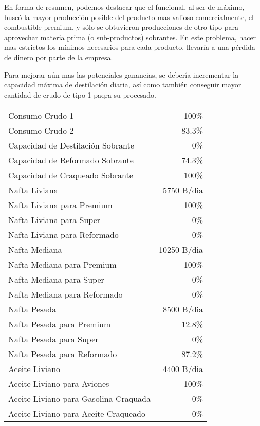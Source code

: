 \documentclass[a4paper,10pt]{article}
\begin{document}
En forma de resumen, podemos destacar que el funcional, al ser de m\'aximo, busc\'o la mayor producci\'on posible del producto mas valioso comercialmente, el combustible premium, y s\'olo se obtuvieron producciones de otro tipo para aprovechar materia prima (o sub-productos) sobrantes. En este problema, hacer mas estrictos los m\'inimos necesarios para cada producto, llevar\'ia a una p\'erdida de dinero por parte de la empresa.

Para mejorar a\'un mas las potenciales ganancias, se deber\'ia incrementar la capacidad m\'axima de destilaci\'on diaria, as\'i como tambi\'en conseguir mayor cantidad de crudo de tipo 1 paqra su procesado. 

\begin{center}
 \begin{tabular}{ l  r }
	\hline
	Consumo Crudo 1 			&	 100\% 	\\
	Consumo Crudo 2 			& 	83.3\%	\\ \hline
	Capacidad de Destilaci\'on Sobrante	&	   0\%	\\
	Capacidad de Reformado Sobrante	&	74.3\%	\\
	Capacidad de Craqueado Sobrante	&	 100\%	\\ \hline
	Nafta Liviana				& 	 5750 B/dia \\
	Nafta Liviana para Premium		& 	 100\%	\\
	Nafta Liviana para Super		& 	   0\%	\\
	Nafta Liviana para Reformado		& 	   0\%	\\ \hline
	Nafta Mediana 				& 	 10250 B/dia\\
	Nafta Mediana para Premium		& 	 100\%	\\
	Nafta Mediana para Super		& 	   0\%	\\
	Nafta Mediana para Reformado		& 	   0\%	\\ \hline
	Nafta Pesada 				&       8500 B/dia	\\
	Nafta Pesada para Premium		&       12.8\%	\\
	Nafta Pesada para Super			&  	   0\%	\\
	Nafta Pesada para Reformado		&       87.2\%	\\ \hline
	Aceite Liviano				&	4400 B/dia \\
	Aceite Liviano para Aviones		& 	  100\%	\\
	Aceite Liviano para Gasolina Craquada	& 	  0\%	\\
	Aceite Liviano para Aceite Craqueado	& 	  0\%	\\

\end{tabular}
\end{center}
\end{document}
